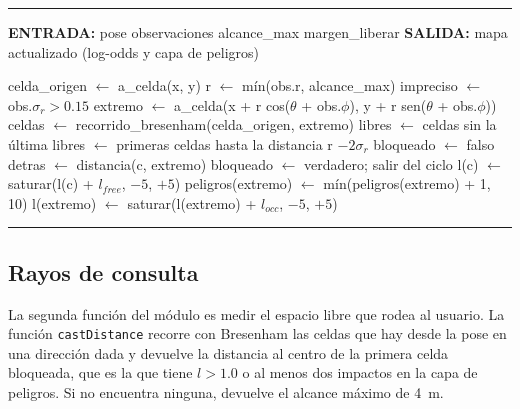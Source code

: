 \begin{center}
\label{alg:dev_ray_update}
\end{center}
\vspace{-1.8cm}
\rule{\textwidth}{0.4pt}
\vspace{-0.9cm}
\begin{algorithmic}[1]

\Statex \textbf{ENTRADA:}
\Statex pose 
\Statex observaciones 
\Statex alcance\_max 
\Statex margen\_liberar 
\Statex \textbf{SALIDA:}
\Statex mapa actualizado (log-odds y capa de peligros)

\Statex
\State celda\_origen $\gets$ a\_celda(x, y)
    \State r $\gets$ mín(obs.r, alcance\_max)
    \State impreciso $\gets$ obs.$\sigma_r > 0.15$
    \State extremo $\gets$ a\_celda(x + r cos($\theta$ + obs.$\phi$), y + r sen($\theta$ + obs.$\phi$))
    \State celdas $\gets$ recorrido\_bresenham(celda\_origen, extremo)
    \State libres $\gets$ celdas sin la última
        \State libres $\gets$ primeras celdas hasta la distancia r $- 2\sigma_r$
    \EndIf
    \State bloqueado $\gets$ falso
            \State detras $\gets$ distancia(c, extremo)
                \State bloqueado $\gets$ verdadero;\; salir del ciclo
            \EndIf
        \EndIf
        \State l(c) $\gets$ saturar(l(c) + $l_{free}$, $-5$, $+5$)
    \EndFor
            \State peligros(extremo) $\gets$ mín(peligros(extremo) + 1, 10)
            \State l(extremo) $\gets$ saturar(l(extremo) + $l_{occ}$, $-5$, $+5$)
        \EndIf
    \EndIf
\EndFor

\end{algorithmic}
\vspace{-0.9cm}
\rule{\textwidth}{0.4pt}

\subsection{Rayos de consulta}

La segunda función del módulo es medir el espacio libre que rodea al usuario. La
función \texttt{castDistance} recorre con Bresenham las celdas que hay desde la pose en
una dirección dada y devuelve la distancia al centro de la primera celda bloqueada, que
es la que tiene $l > 1.0$ o al menos dos impactos en la capa de peligros. Si no
encuentra ninguna, devuelve el alcance máximo de 4~m.

